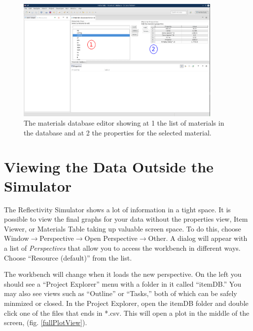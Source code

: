 \begin{figure}[!h]
\centering
\includegraphics[width=10cm]{images/materialsDatabase_coated.png}
\caption{The materials database editor showing at 1 the list of materials in
the database and at 2 the properties for the selected material.}
\label{matDB}
\end{figure}

\section{Viewing the Data Outside the Simulator}
\label{viz}

The Reflectivity Simulator shows a lot of information in a tight space. It is
possible to view the final graphs for your data without the properties view,
Item Viewer, or Materials Table taking up valuable screen space. To do this,
choose Window$\rightarrow$Perspective$\rightarrow$Open
Perspective$\rightarrow$Other. A dialog will appear with a list of
\textit{Perspectives} that allow you to access the workbench in different ways.
Choose ``Resource (default)'' from the list.

The workbench will change when it loads the new perspective. On the left you
should see a ``Project Explorer'' menu with a folder in it called ``itemDB.''
You may also see views such as ``Outline'' or ``Tasks,'' both of which can be
safely minmized or closed. In the Project Explorer, open the itemDB folder and
double click one of the files that ends in *.csv. This will open a plot in the
middle of the screen, (fig. \ref{fullPlotView}).

